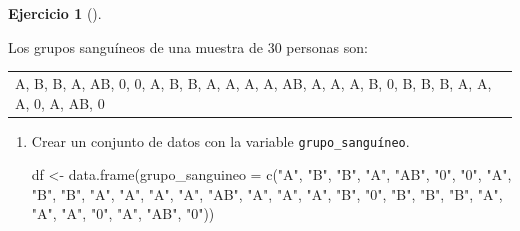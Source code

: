 \documentclass[
  a4paper,
]{scrreport}
\newenvironment{Shaded}{\begin{snugshade}}{\end{snugshade}}
\newcommand{\AttributeTok}[1]{\textcolor[rgb]{0.40,0.45,0.13}{#1}}
\newcommand{\FunctionTok}[1]{\textcolor[rgb]{0.28,0.35,0.67}{#1}}
\newcommand{\NormalTok}[1]{\textcolor[rgb]{0.00,0.23,0.31}{#1}}
\newcommand{\OtherTok}[1]{\textcolor[rgb]{0.00,0.23,0.31}{#1}}
\newcommand{\StringTok}[1]{\textcolor[rgb]{0.13,0.47,0.30}{#1}}
\theoremstyle{definition}
\newtheorem{exercise}{Ejercicio}[chapter]
\theoremstyle{remark}
\begin{document}
\begin{exercise}[]\protect\hypertarget{exr-frecuencias-graficos-3}{}\label{exr-frecuencias-graficos-3}

Los grupos sanguíneos de una muestra de 30 personas son:

\begin{longtable}[]{@{}
  >{\centering\arraybackslash}p{}@{}}
\toprule\noalign{}
\endhead
\bottomrule\noalign{}
\endlastfoot
A, B, B, A, AB, 0, 0, A, B, B, A, A, A, A, AB, A, A, A, B, 0, B, B, B,
A, A, A, 0, A, AB, 0 \\
\end{longtable}

\begin{enumerate}
\def\labelenumi{\alph{enumi}.}
\item
  Crear un conjunto de datos con la variable \texttt{grupo\_sanguíneo}.

  \begin{tcolorbox}[enhanced jigsaw, toprule=.15mm, rightrule=.15mm, arc=.35mm, colback=white, colbacktitle=quarto-callout-tip-color!10!white, toptitle=1mm, left=2mm, colframe=quarto-callout-tip-color-frame, opacityback=0, breakable, opacitybacktitle=0.6, bottomtitle=1mm, titlerule=0mm, title=\textcolor{quarto-callout-tip-color}{\faLightbulb}\hspace{0.5em}{Solución}, bottomrule=.15mm, coltitle=black, leftrule=.75mm]

\begin{Shaded}
\begin{Highlighting}[]
\NormalTok{df }\OtherTok{\textless{}{-}} \FunctionTok{data.frame}\NormalTok{(}\AttributeTok{grupo\_sanguineo =} \FunctionTok{c}\NormalTok{(}\StringTok{"A"}\NormalTok{, }\StringTok{"B"}\NormalTok{, }\StringTok{"B"}\NormalTok{, }\StringTok{"A"}\NormalTok{, }\StringTok{"AB"}\NormalTok{, }\StringTok{"0"}\NormalTok{, }\StringTok{"0"}\NormalTok{, }\StringTok{"A"}\NormalTok{, }\StringTok{"B"}\NormalTok{, }\StringTok{"B"}\NormalTok{, }\StringTok{"A"}\NormalTok{, }\StringTok{"A"}\NormalTok{, }\StringTok{"A"}\NormalTok{, }\StringTok{"A"}\NormalTok{, }\StringTok{"AB"}\NormalTok{, }\StringTok{"A"}\NormalTok{, }\StringTok{"A"}\NormalTok{, }\StringTok{"A"}\NormalTok{, }\StringTok{"B"}\NormalTok{, }\StringTok{"0"}\NormalTok{, }\StringTok{"B"}\NormalTok{, }\StringTok{"B"}\NormalTok{, }\StringTok{"B"}\NormalTok{, }\StringTok{"A"}\NormalTok{, }\StringTok{"A"}\NormalTok{, }\StringTok{"A"}\NormalTok{, }\StringTok{"0"}\NormalTok{, }\StringTok{"A"}\NormalTok{, }\StringTok{"AB"}\NormalTok{, }\StringTok{"0"}\NormalTok{))}
\end{Highlighting}
\end{Shaded}


\end{tcolorbox}
\end{enumerate}
\end{exercise}
\end{document}
